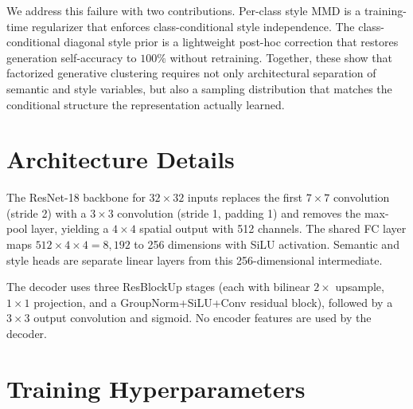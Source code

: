 \documentclass[10pt]{article}
\begin{document}
We address this failure with two contributions.
Per-class style MMD is a training-time regularizer that enforces class-conditional
style independence.
The class-conditional diagonal style prior is a lightweight post-hoc correction
that restores generation self-accuracy to $100\%$ without retraining.
Together, these show that factorized generative clustering requires not only
architectural separation of semantic and style variables, but also a sampling
distribution that matches the conditional structure the representation actually
learned.




\appendix

\section{Architecture Details}
\label{app:arch}

The ResNet-18 backbone for $32\times32$ inputs replaces the first $7\times7$
convolution (stride 2) with a $3\times3$ convolution (stride 1, padding 1) and
removes the max-pool layer, yielding a $4\times4$ spatial output with 512 channels.
The shared FC layer maps $512\times4\times4=8{,}192$ to 256 dimensions with SiLU
activation.
Semantic and style heads are separate linear layers from this 256-dimensional
intermediate.

The decoder uses three ResBlockUp stages (each with bilinear $2\times$ upsample,
$1\times1$ projection, and a GroupNorm+SiLU+Conv residual block), followed by a
$3\times3$ output convolution and sigmoid.
No encoder features are used by the decoder.

\section{Training Hyperparameters}
\label{app:training}
\end{document}

